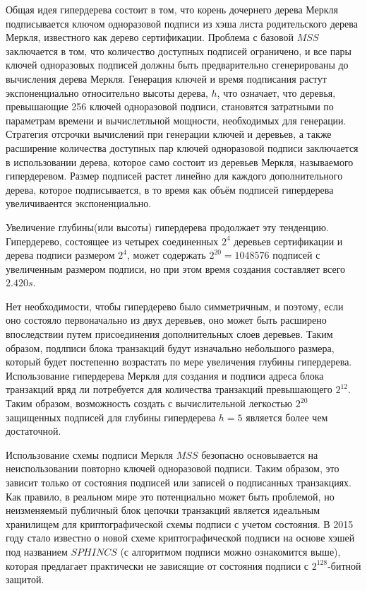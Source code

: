 \documentclass[a4paper, 14pt]{extarticle}
\begin{document}
Общая идея гипердерева состоит в том, что корень дочернего дерева Меркля подписывается ключом одноразовой подписи из хэша листа родительского дерева Меркля, известного как дерево сертификации. Проблема с базовой $MSS$ заключается в том, что количество доступных подписей ограничено, и все пары ключей одноразовых подписей должны быть предварительно сгенерированы до вычисления дерева Меркля. Генерация ключей и время подписания растут экспоненциально относительно высоты дерева, $h$, что означает, что деревья, превышающие 256 ключей одноразовой подписи, становятся затратными по параметрам времени и вычислетльной мощности, необходимых для генерации. Стратегия отсрочки вычислений при генерации ключей и деревьев, а также расширение количества доступных пар ключей одноразовой подписи заключается в использовании дерева, которое само состоит из деревьев Меркля, называемого гипердеревом. Размер подписей растет линейно для каждого дополнительного дерева, которое подписывается, в то время как объём подписей гипердерева увеличиваентся экспоненциально.

Увеличение глубины(или высоты) гипердерева продолжает эту тенденцию. Гипердерево, состоящее из четырех соединенных $2^4$ деревьев сертификации и дерева подписи размером $2^4$, может содержать $2^20 = 1 048 576$ подписей с увеличенным размером подписи, но при этом время создания составляет всего $2.420s$.

Нет необходимости, чтобы гипердерево было симметричным, и поэтому, если оно состояло первоначально из двух деревьев, оно может быть расширено впоследствии путем присоединения дополнительных слоев деревьев. Таким образом, подлписи блока транзакций будут изначально небольшого размера, который будет постепенно возрастать по мере увеличения глубины гипердерева. Использование гипердерева Меркля для создания и подписи адреса блока транзакций вряд ли потребуется для количества транзакций превышающего $2^12$. Таким образом, возможность создать с вычислительной легкостью $2^20$ защищенных подписей для глубины гипердерева $h = 5$ является более чем достаточной.

Использование схемы подписи Меркля $MSS$ безопасно основывается на неиспользовании повторно ключей одноразовой подписи. Таким образом, это зависит только от состояния подписей или записей о подписанных транзакциях. Как правило, в реальном мире это потенциально может быть проблемой, но неизменяемый публичный блок цепочки транзакций является идеальным хранилищем для криптографической схемы подписи с учетом состояния. В 2015 году стало известно о новой схеме криптографической подписи на основе хэшей под названием $SPHINCS$ (с алгоритмом подписи можно ознакомится выше), которая предлагает практически не зависящие от состояния подписи с $2^128$-битной защитой.
\end{document}
